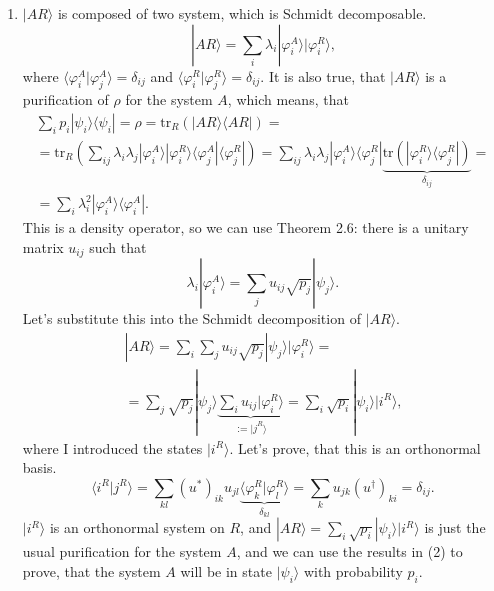 \documentclass[a4paper,12pt]{article}
\newcommand{\la}{\langle}
\newcommand{\ra}{\rangle}
\begin{document}
\begin{enumerate}[label=(\arabic*)]
        \item \cite{goropikari} $| AR \ra$ is composed of two system, which is Schmidt decomposable.
            \begin{equation}
                | AR \ra = \sum_i \lambda_i | \varphi^A_i \ra | \varphi^R_i \ra \textrm{,}
            \end{equation}
            where $\la \varphi^A_i | \varphi^A_j \ra = \delta_{ij}$ and $\la \varphi^R_i | \varphi^R_j \ra = \delta_{ij}$.
            It is also true, that $| AR \ra$ is a purification of $\rho$ for the system $A$, which means, that
            \begin{gather}
                \nonumber
                \sum_i p_i | \psi_i \ra \la \psi_i | = \rho = \textrm{tr}_R ( | AR \ra \la AR | ) =\\
                \nonumber
                = \textrm{tr}_R \left( \sum_{ij} \lambda_i \lambda_j | \varphi^A_i \ra | \varphi^R_i \ra \la \varphi^A_j | \la \varphi^R_j | \right) =
                \sum_{ij} \lambda_i \lambda_j | \varphi^A_i \ra \la \varphi^R_j | \underbrace{\textrm{tr}(| \varphi^R_i \ra \la \varphi^R_j |)}_{\delta_{ij}} =\\
                = \sum_i \lambda_i^2 | \varphi^A_i \ra \la \varphi^A_i | \textrm{.}
            \end{gather}
            This is a density operator, so we can use Theorem 2.6: there is a unitary matrix $u_{ij}$ such that
            \begin{equation}
                \lambda_i | \varphi^A_i \ra = \sum_j u_{ij} \sqrt{p_j} | \psi_j \ra \textrm{.}
            \end{equation}
            Let's substitute this into the Schmidt decomposition of $|AR \ra$.
            \begin{gather}
                \nonumber
                | AR \ra = \sum_i \sum_j u_{ij} \sqrt{p_j} | \psi_j \ra | \varphi^R_i \ra =\\
                = \sum_j \sqrt{p_j} | \psi_j \ra \underbrace{\sum_i u_{ij} | \varphi_i^R \ra}_{:= | j^R \ra} = \sum_i \sqrt{p_i} | \psi_i \ra | i^R \ra \textrm{,}
            \end{gather}
            where I introduced the states $| i^R \ra$. Let's prove, that this is an orthonormal basis.
            \begin{equation}
                \la i^R | j^R \ra =
                \sum_{kl} (u^*)_{ik} u_{jl} \underbrace{\la \varphi^R_k | \varphi^R_l \ra}_{\delta_{kl}} =
                \sum_k u_{jk} (u^\dagger)_{ki} = \delta_{ij} \textrm{.}
            \end{equation}
            $|i^R \ra$ is an orthonormal system on $R$, and $| AR \ra = \sum_i \sqrt{p_i} | \psi_i \ra | i^R \ra$ is just the usual purification for the system $A$, and we can use the results in (2) to prove, that the system $A$ will be in state $| \psi_i \ra$ with probability $p_i$.

    \end{enumerate}
\end{document}
